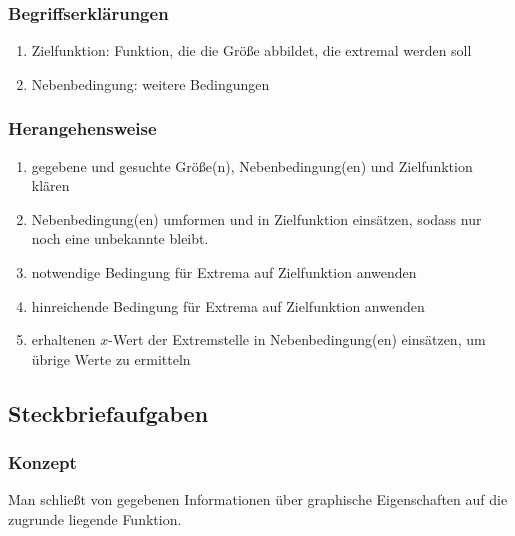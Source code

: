 \documentclass{article}
\begin{document}
  \subsubsection{Begriffserklärungen}
  \begin{enumerate}
  	\item Zielfunktion: Funktion, die die Größe abbildet, die extremal werden soll
  	\item Nebenbedingung: weitere Bedingungen
  \end{enumerate}
  
  \subsubsection{Herangehensweise}
  \begin{enumerate}
  	\item gegebene und gesuchte Größe(n), Nebenbedingung(en) und Zielfunktion klären
  	\item Nebenbedingung(en) umformen und in Zielfunktion einsätzen, sodass nur noch eine unbekannte bleibt.
  	\item notwendige Bedingung für Extrema auf Zielfunktion anwenden
  	\item hinreichende Bedingung für Extrema auf Zielfunktion anwenden
  	\item erhaltenen $x$-Wert der Extremstelle in Nebenbedingung(en) einsätzen, um übrige Werte zu ermitteln
  \end{enumerate}
  
  \subsection{Steckbriefaufgaben}
  
  \subsubsection{Konzept}
  Man schließt von gegebenen Informationen über graphische Eigenschaften auf die zugrunde liegende Funktion.
  
\end{document}
